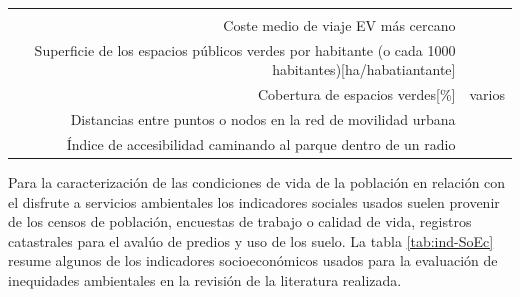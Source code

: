 \documentclass[12pt,]{book}
\begin{document}
\begin{longtable}[]{@{}rr@{}}
\begin{minipage}[t]{0.31\columnwidth}
\citep{talen_assessing_1998}\strut
\end{minipage}\tabularnewline
\begin{minipage}[t]{0.57\columnwidth}\raggedleft\strut
Coste medio de viaje EV más cercano\strut
\end{minipage} & \begin{minipage}[t]{0.31\columnwidth}\raggedleft\strut
\citep{talen_assessing_1998}\strut
\end{minipage}\tabularnewline
\begin{minipage}[t]{0.57\columnwidth}\raggedleft\strut
Superficie de los espacios públicos verdes por habitante (o cada 1000
habitantes){[}ha/habatiantante{]}\strut
\end{minipage} & \begin{minipage}[t]{0.31\columnwidth}\raggedleft\strut
\strut
\end{minipage}\tabularnewline
\begin{minipage}[t]{0.57\columnwidth}\raggedleft\strut
Cobertura de espacios verdes{[}\%{]}\strut
\end{minipage} & \begin{minipage}[t]{0.31\columnwidth}\raggedleft\strut
varios\strut
\end{minipage}\tabularnewline
\begin{minipage}[t]{0.57\columnwidth}\raggedleft\strut
Distancias entre puntos o nodos en la red de movilidad urbana\strut
\end{minipage} & \begin{minipage}[t]{0.31\columnwidth}\raggedleft\strut
\citep{comber_using_2008}\strut
\end{minipage}\tabularnewline
\begin{minipage}[t]{0.57\columnwidth}\raggedleft\strut
Índice de accesibilidad caminando al parque dentro de un radio\strut
\end{minipage} & \begin{minipage}[t]{0.31\columnwidth}\raggedleft\strut
\citep{zhou_social_2013}\strut
\end{minipage}\tabularnewline
\bottomrule
\end{longtable}

Para la caracterización de las condiciones de vida de la población en
relación con el disfrute a servicios ambientales los indicadores
sociales usados suelen provenir de los censos de población, encuestas de
trabajo o calidad de vida, registros catastrales para el avalúo de
predios y uso de los suelo. La tabla \ref{tab:ind-SoEc} resume algunos
de los indicadores socioeconómicos usados para la evaluación de
inequidades ambientales en la revisión de la literatura realizada.
\end{document}
